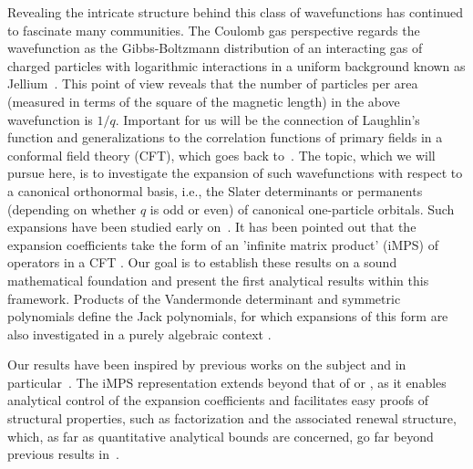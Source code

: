 \documentclass[letterpaper, DIV=17]{scrartcl}
\numberwithin{equation}{section}
\theoremstyle{definition}
\begin{document}
Revealing the intricate structure behind this class of wavefunctions has continued to fascinate many communities. The Coulomb gas perspective regards the wavefunction as the Gibbs-Boltzmann distribution of an interacting gas of charged particles with logarithmic interactions in a uniform background known as Jellium~\cite{di1994laughlin,Aizenman:2010aa,jansen2012fermionic,RSY:2014,Lieb:2019vl,Roug19}.  This point of view reveals that the number of particles per area (measured in terms of the square of the magnetic length)  in the above wavefunction is $ 1/q $.  Important for us will be the connection of
Laughlin's function and generalizations to the correlation functions of primary
fields in a conformal field theory (CFT), which goes back to~\cite{moore1991nonabelions,ReadMoore92}. 
The topic, which we will pursue here, is to investigate the expansion of such wavefunctions with respect to a canonical orthonormal basis, i.e., the Slater determinants or permanents (depending on whether $ q $ is odd or even) of canonical one-particle orbitals.  Such expansions have been studied early on~\cite{dunne1993slater, di1994laughlin}.  It has been pointed out that the expansion coefficients take the form of an 'infinite matrix product' (iMPS) of operators in a CFT  \cite{PhysRevB.86.245305,Bernevig:2009aa,Cirac:2010aa,thomale2011decomposition, ballantine2012powers,estienne2013fractional,schossler2022inner}. Our goal is to establish these results on a sound mathematical foundation and present the first analytical results within this framework. 
Products of the Vandermonde determinant and symmetric polynomials define the Jack polynomials, for which expansions of this form are also investigated in a purely algebraic context \cite{Cai:2014cz}.  

Our results have been inspired by previous works on the subject and in particular~\cite{jansen2009symmetry,estienne2013fractional,nachtergaele2021spectral}. The iMPS representation extends beyond that of \cite{estienne2013fractional} or \cite{Cai:2014cz}, as it enables analytical control of the expansion coefficients and facilitates easy proofs of structural properties, such as factorization and the associated renewal structure, which,  as far as quantitative analytical bounds are concerned, go far beyond previous results in~\cite{jansen2009symmetry,jansen2012fermionic}.
\end{document}
